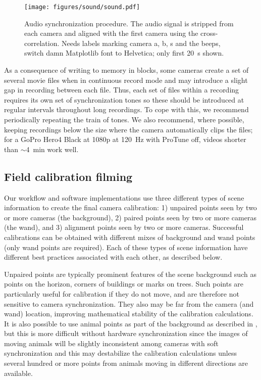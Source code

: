 \documentclass[fleqn,10pt]{wlpeerj}
\begin{document}
\begin{figure}
\caption{Audio synchronization procedure.  The audio signal is stripped from each camera and aligned with the first camera using the cross-correlation. Needs labels marking camera a, b, s and the beeps, switch damn Matplotlib font to Helvetica; only first \SI{20}{\second} shown.}
\label{fig:audiosync}
\begin{center}
\texttt{[image: figures/sound/sound.pdf]}
\end{center}
\end{figure}

As a consequence of writing to memory in blocks, some cameras create a set of several movie files when in continuous record mode and may introduce a slight gap in recording between each file. Thus, each set of files within a recording requires its own set of synchronization tones so these should be introduced at regular intervals throughout long recordings.  To cope with this, we recommend periodically repeating the train of tones.  We also recommend, where possible, keeping recordings below the size where the camera automatically clips the files; for a GoPro Hero4 Black at 1080p at \SI{120}{\hertz} with ProTune off, videos shorter than $\sim$\SI{4}{\minute} work well.




 

\subsection*{Field calibration filming}
Our workflow and software implementations use three different types of scene information to create the final camera calibration: 1) unpaired points seen by two or more cameras (the background), 2) paired points seen by two or more cameras (the wand), and 3) alignment points seen by two or more cameras. Successful calibrations can be obtained with different mixes of background and wand points (only wand points are required). Each of these types of scene information have different best practices associated with each other, as described below.

Unpaired points are typically prominent features of the scene background such as points on the horizon, corners of buildings or marks on trees. Such points are particularly useful for calibration if they do not move, and are therefore not sensitive to camera synchronization.  They also may be far from the camera (and wand) location, improving mathematical stability of the calibration calculations. It is also possible to use animal points as part of the background as described in \citep{Theriault:2014}, but this is more difficult without hardware synchronization since the images of moving animals will be slightly inconsistent among cameras with soft synchronization and this may destabilize the calibration calculations unless several hundred or more points from animals moving in different directions are available.
\end{document}
